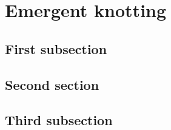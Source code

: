\chapter{Emergent knotting}

\section{First subsection}

\section{Second section}

\section{Third subsection}
